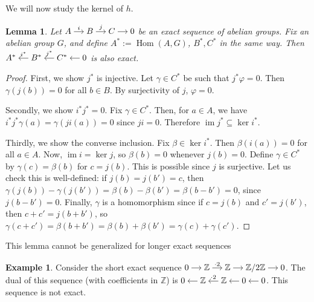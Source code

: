 \documentclass{book}
\newcommand{\bbZ}{\mathbb{Z}}
\newcommand{\bbZmod}[1]{\bbZ/{#1}\bbZ}
\renewcommand{\phi}{\varphi}
\DeclareMathOperator{\im}{im}
\DeclareMathOperator{\Hom}{Hom}
\newtheorem{lemma}[theorem]{Lemma}
\theoremstyle{definition}
\newtheorem{example}[theorem]{Example}
\theoremstyle{remark}
\numberwithin{equation}{section}
\begin{document}
We will now study the kernel of $h$.
\begin{lemma}
    Let $\begin{tikzcd}[cramped,sep=small] A \arrow[r,"i"] & B \arrow[r,"j"] & C \arrow[r] & 0 \end{tikzcd}$ be an exact sequence of abelian groups. Fix an abelian group $G$, and define $A^* := \Hom(A,G)$, $B^*,C^*$ in the same way. Then $\begin{tikzcd}[cramped,sep=small] A^* & B^* \arrow[l,"i^*" above] & C^* \arrow[l,"j^*" above] & 0 \arrow[l] \end{tikzcd}$ is also exact.
\end{lemma}
\begin{proof}
    First, we show $j^*$ is injective. Let $\gamma \in C^*$ be such that $j^*\phi = 0$. Then $\gamma(j(b)) = 0$ for all $b \in B$. By surjectivity of $j$, $\phi = 0$.

    Secondly, we show $i^* j^* = 0$. Fix $\gamma \in C^*$. Then, for $a \in A$, we have $i^* j^* \gamma(a) = \gamma(ji(a)) = 0$ since $ji = 0$. Therefore $\im{j^*} \subseteq \ker{i^*}$.

    Thirdly, we show the converse inclusion. Fix $\beta \in \ker{i^*}$. Then $\beta(i(a)) = 0$ for all $a \in A$. Now, $\im{i} = \ker{j}$, so $\beta(b) = 0$ whenever $j(b) = 0$. Define $\gamma \in C^*$ by $\gamma(c) = \beta(b)$ for $c = j(b)$. This is possible since $j$ is surjective. Let us check this is well-defined: if $j(b) = j(b') = c$, then $\gamma(j(b)) - \gamma(j(b')) = \beta(b) - \beta(b') = \beta(b-b') = 0$, since $j(b-b') = 0$. Finally, $\gamma$ is a homomorphism since if $c = j(b)$ and $c' = j(b')$, then $c+c' = j(b+b')$, so $\gamma(c + c') = \beta(b+b') = \beta(b) + \beta(b') = \gamma(c) + \gamma(c')$.
\end{proof}
This lemma cannot be generalized for longer exact sequences
\begin{example} \label{eg:freeResolutionOfZmod2}
    Consider the short exact sequence $\begin{tikzcd}[cramped,sep=small] 0 \arrow[r] & \bbZ \arrow[r,"\cdot 2"] & \bbZ \arrow[r] & \bbZmod{2} \arrow[r] & 0 \end{tikzcd}$. The dual of this sequence (with coefficients in $\bbZ$) is $\begin{tikzcd}[cramped,sep=small] 0 & \bbZ \arrow[l] & \bbZ \arrow[l,"\cdot 2" above] & 0 \arrow[l] & 0 \arrow[l] \end{tikzcd}$. This sequence is not exact.
\end{example}
\end{document}
